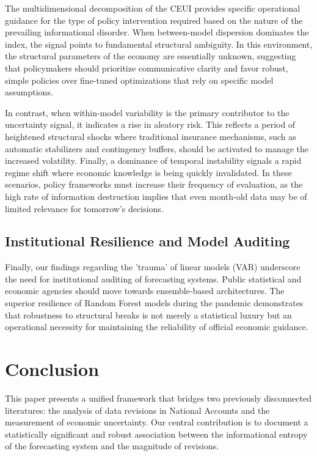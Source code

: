 \documentclass[12pt,a4paper]{article}
\theoremstyle{remark}
\begin{document}
The multidimensional decomposition of the CEUI provides specific operational guidance for the type of policy intervention required based on the nature of the prevailing informational disorder. When between-model dispersion dominates the index, the signal points to fundamental structural ambiguity. In this environment, the structural parameters of the economy are essentially unknown, suggesting that policymakers should prioritize communicative clarity and favor robust, simple policies over fine-tuned optimizations that rely on specific model assumptions.

In contrast, when within-model variability is the primary contributor to the uncertainty signal, it indicates a rise in aleatory risk. This reflects a period of heightened structural shocks where traditional insurance mechanisms, such as automatic stabilizers and contingency buffers, should be activated to manage the increased volatility. Finally, a dominance of temporal instability signals a rapid regime shift where economic knowledge is being quickly invalidated. In these scenarios, policy frameworks must increase their frequency of evaluation, as the high rate of information destruction implies that even month-old data may be of limited relevance for tomorrow's decisions.

\subsection{Institutional Resilience and Model Auditing}

Finally, our findings regarding the 'trauma' of linear models (VAR) underscore the need for institutional auditing of forecasting systems. Public statistical and economic agencies should move towards ensemble-based architectures. The superior resilience of Random Forest models during the pandemic demonstrates that robustness to structural breaks is not merely a statistical luxury but an operational necessity for maintaining the reliability of official economic guidance.

\section{Conclusion}
\label{sec:conclusion}

This paper presents a unified framework that bridges two previously disconnected
literatures: the analysis of data revisions in National Accounts and the measurement
of economic uncertainty. Our central contribution is to document a statistically significant and robust association between the informational entropy of the forecasting system and the magnitude of revisions.
\end{document}
